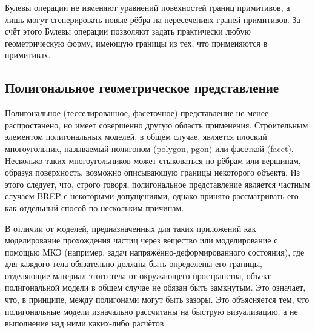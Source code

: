 Булевы операции не изменяют уравнений повехностей границ примитивов, а лишь могут сгенерировать новые рёбра на пересечениях граней примитивов. За счёт этого Булевы операции позволяют задать практически любую геометрическую форму, имеющую границы из тех, что применяются в примитивах.



\subsection{Полигональное геометрическое представление}\label{sec:secGeoPoly}

Полигональное (тесселированное, фасеточное) представление не менее распростанено, но имеет совершенно другую область применения. Строительным элементом полигональных моделей, в общем случае, является плоский многоугольник, называемый полигоном (polygon, pgon) или фасеткой (facet). Несколько таких многоугольников может стыковаться по рёбрам или вершинам, образуя поверхность, возможно описывающую границы некоторого объекта. Из этого следует, что, строго говоря, полигональное представление является частным случаем BREP с некоторыми допущениями, однако принято рассматривать его как отдельный способ по нескольким причинам.

В отличии от моделей, предназначенных для таких приложений как моделирование прохождения частиц через вещество или моделирование с помощью МКЭ (например, задач напряжённо-деформированного состояния), где для каждого тела обязательно должны быть определены его границы, отделяющие материал этого тела от окружающего пространства, объект полигональной модели в общем случае не обязан быть замкнутым. Это означает, что, в принципе, между полигонами могут быть зазоры. Это объясняется тем, что полигональные модели изначально рассчитаны на быструю визуализацию, а не выполнение над ними каких-либо расчётов.

